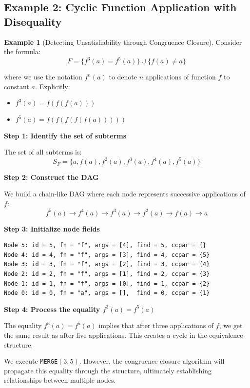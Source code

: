 \documentclass[11pt,a4paper]{article}
\theoremstyle{definition}
\newtheorem{example}{Example}[section]
\theoremstyle{plain}
\theoremstyle{remark}
\begin{document}
\subsection{Example 2: Cyclic Function Application with Disequality}

\begin{example}[Detecting Unsatisfiability through Congruence Closure]
Consider the formula:
\[
F = \{f^3(a) = f^5(a)\} \cup \{f(a) \neq a\}
\]

where we use the notation $f^n(a)$ to denote $n$ applications of function $f$ to constant $a$. Explicitly:
\begin{itemize}
    \item $f^3(a) = f(f(f(a)))$
    \item $f^5(a) = f(f(f(f(f(a)))))$
\end{itemize}

\textbf{Step 1: Identify the set of subterms}

The set of all subterms is:
\[
S_F = \{a, f(a), f^2(a), f^3(a), f^4(a), f^5(a)\}
\]

\textbf{Step 2: Construct the DAG}

We build a chain-like DAG where each node represents successive applications of $f$:
\[
f^5(a) \rightarrow f^4(a) \rightarrow f^3(a) \rightarrow f^2(a) \rightarrow f(a) \rightarrow a
\]

\textbf{Step 3: Initialize node fields}

\begin{tcolorbox}[colback=blue!5!white,colframe=blue!75!black,title=\textbf{Initial DAG Configuration}]
\begin{verbatim}
Node 5: id = 5, fn = "f", args = [4], find = 5, ccpar = {}
Node 4: id = 4, fn = "f", args = [3], find = 4, ccpar = {5}
Node 3: id = 3, fn = "f", args = [2], find = 3, ccpar = {4}
Node 2: id = 2, fn = "f", args = [1], find = 2, ccpar = {3}
Node 1: id = 1, fn = "f", args = [0], find = 1, ccpar = {2}
Node 0: id = 0, fn = "a", args = [],  find = 0, ccpar = {1}
\end{verbatim}
\end{tcolorbox}

\textbf{Step 4: Process the equality $f^3(a) = f^5(a)$}

The equality $f^3(a) = f^5(a)$ implies that after three applications of $f$, we get the same result as after five applications. This creates a cycle in the equivalence structure.

We execute \texttt{MERGE}$(3, 5)$. However, the congruence closure algorithm will propagate this equality through the structure, ultimately establishing relationships between multiple nodes.


\end{example}
\end{document}
